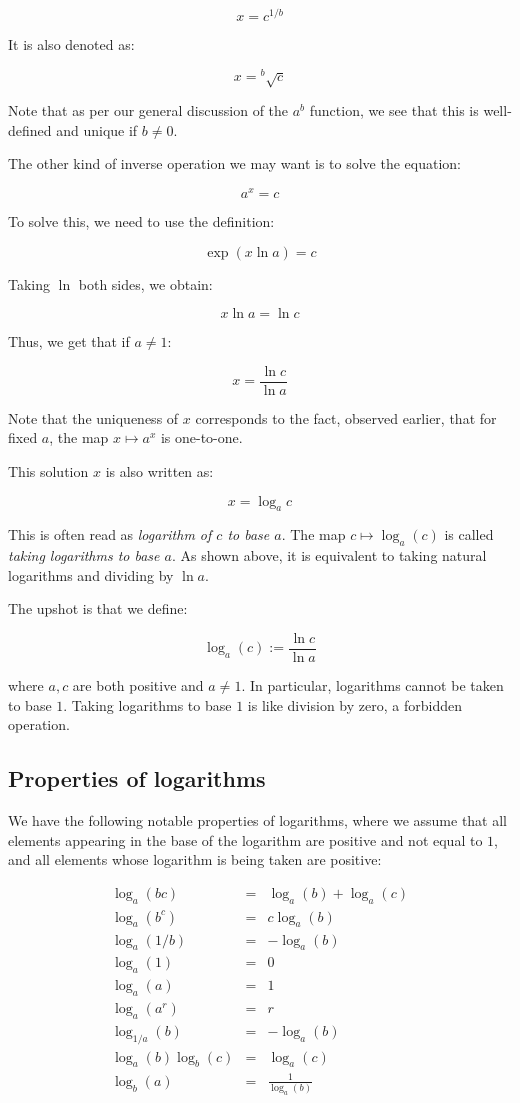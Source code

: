 \documentclass[10pt]{amsart}
\begin{document}
$$x = c^{1/b}$$

It is also denoted as:

$$x = {}^b\surd{c}$$

Note that as per our general discussion of the $a^b$ function, we see
that this is well-defined and unique if $b \ne 0$.

The other kind of inverse operation we may want is to solve the equation:

$$a^x = c$$

To solve this, we need to use the definition:

$$\exp(x \ln a) = c$$

Taking $\ln$ both sides, we obtain:

$$x \ln a = \ln c$$

Thus, we get that if $a \ne 1$:

$$x = \frac{\ln c}{\ln a}$$

Note that the uniqueness of $x$ corresponds to the fact, observed
earlier, that for fixed $a$, the map $x \mapsto a^x$ is one-to-one.

This solution $x$ is also written as:

$$x = \log_a c$$

This is often read as {\em logarithm of $c$ to base $a$}. The map $c
\mapsto \log_a(c)$ is called {\em taking logarithms to base $a$}. As
shown above, it is equivalent to taking natural logarithms and dividing
by $\ln a$.

The upshot is that we define:

$$\log_a(c) := \frac{\ln c}{\ln a}$$

where $a,c$ are both positive and $a \ne 1$. In particular, logarithms
cannot be taken to base $1$. Taking logarithms to base $1$ is like
division by zero, a forbidden operation.

\subsection{Properties of logarithms}

We have the following notable properties of logarithms, where we
assume that all elements appearing in the base of the logarithm are
positive and not equal to $1$, and all elements whose logarithm is
being taken are positive:

\begin{eqnarray*}
  \log_a(bc) & = & \log_a(b) + \log_a(c)\\
  \log_a(b^c) & = & c \log_a(b)\\
  \log_a(1/b) & = & -\log_a(b)\\
  \log_a(1) & = & 0\\
  \log_a(a) & = & 1\\
  \log_a(a^r) & = & r\\
  \log_{1/a}(b) & = & - \log_a(b)\\
  \log_a(b) \log_b(c) & = & \log_a(c)\\
  \log_b(a) & = & \frac{1}{\log_a(b)}
\end{eqnarray*}
\end{document}
